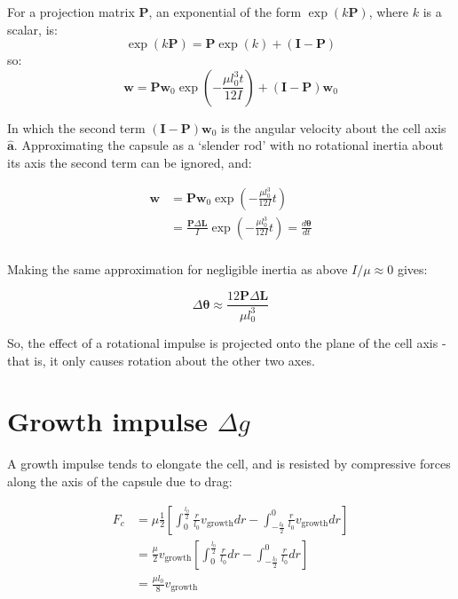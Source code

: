 \documentclass{report}
\let\oldhat\hat
\renewcommand{\vec}[1]{\mathbf{#1}}
\renewcommand{\hat}[1]{\oldhat{\mathbf{#1}}}
\newcommand{\mat}{\mathbf}
\newcommand{\deltaL}{\Delta \vec{L}}
\begin{document}
\begin{appendices}
For a projection matrix $\mat{P}$, an exponential of the form $\exp{(k\mat{P})}$, where $k$ is a scalar, is:
\[\exp{(k\mat{P})} = \mat{P}\exp{(k)} +  \left(\mat{I}-\mat{P}\right)\]
 so:
\[\vec{w} = \mat{P} \vec{w}_0 \exp{\left( -\frac{\mu l_0^3 t}{12 I} \right)} + \left(\mat{I}-\mat{P}\right) \vec{w}_0\]


In which the second term $\left(\mat{I}-\mat{P}\right) \vec{w}_0$ is the angular velocity about the cell axis $\hat{a}$.
Approximating the capsule as a `slender rod' with no rotational inertia about its axis 
the second term can be ignored, and:

\begin{align*}
\vec{w} &= \mat{P} \vec{w}_0\exp{(-\frac{\mu l_0^3}{12I}t)} \\
&= \frac{\mat{P} \deltaL}{I}\exp{(-\frac{\mu l_0^3}{12I}t)} = \frac{d\vec{\theta}}{dt} \\
\end{align*}

Making the same approximation for negligible inertia as above $I/\mu \approx
0$ gives:

\begin{equation}
\Delta \vec{\theta} \approx \frac{12 \mat{P} \deltaL}{\mu l_0^3} 
\label{eqn:deltatheta}
\end{equation}

So, the effect of a rotational impulse is projected onto the plane of the cell axis - that is, it only causes rotation 
about the other two axes.

\section{Growth impulse $\Delta g$}
A growth impulse tends to elongate the cell, and is resisted by compressive forces along the axis of the capsule due to drag:

\begin{align*}
    F_c &= \mu \frac{1}{2} \left[ \int_{0}^{\frac{l_0}{2}}{\frac{r}{l_0}v_\textrm{growth}} dr 
    - \int_{-\frac{l_0}{2}}^{0}{\frac{r}{l_0}v_\textrm{growth}} dr \right] \\
    &= \frac{\mu}{2} v_\textrm{growth} \left[ \int_{0}^{\frac{l_0}{2}}{\frac{r}{l_0}} dr 
    - \int_{-\frac{l_0}{2}}^{0}{\frac{r}{l_0}} dr \right] \\
    &= \frac{\mu l_0}{8} v_\textrm{growth}
\end{align*}


\end{appendices}
\end{document}
